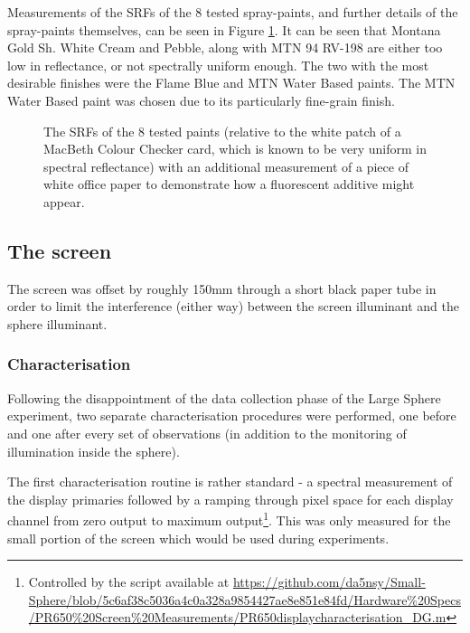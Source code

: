 Measurements of the \glspl{SRF} of the 8 tested spray-paints, and further details of the spray-paints themselves, can be seen in Figure \ref{fig:spray}. It can be seen that Montana Gold Sh. White Cream and Pebble, along with MTN 94 RV-198 are either too low in reflectance, or not spectrally uniform enough. The two with the most desirable finishes were the Flame Blue and MTN Water Based paints. The MTN Water Based paint was chosen due to its particularly fine-grain finish.

\begin{figure}[htbp]
\caption{The \glspl{SRF} of the 8 tested paints (relative to the white patch of a MacBeth Colour Checker card, which is known to be very uniform in spectral reflectance) with an additional measurement of a piece of white office paper to demonstrate how a fluorescent additive might appear.}
\label{fig:spray}
\end{figure}


\subsection{The screen}

The screen was offset by roughly 150mm through a short black paper tube in order to limit the interference (either way) between the screen illuminant and the sphere illuminant. 


\subsubsection{Characterisation}

Following the disappointment of the data collection phase of the Large Sphere experiment, two separate characterisation procedures were performed, one before and one after every set of observations (in addition to the monitoring of illumination inside the sphere).

The first characterisation routine is rather standard - a spectral measurement of the display primaries followed by a ramping through pixel space for each display channel from zero output to maximum output\footnote{Controlled by the script available at \url{https://github.com/da5nsy/Small-Sphere/blob/5c6af38c5036a4c0a328a9854427ae8e851e84fd/Hardware\%20Specs/PR650\%20Screen\%20Measurements/PR650displaycharacterisation_DG.m}}. This was only measured for the small portion of the screen which would be used during experiments.

